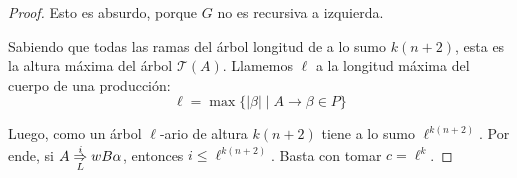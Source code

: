 \begin{proof}
    Esto es absurdo, porque $G$ no es recursiva a izquierda.

    Sabiendo que todas las ramas del árbol longitud de a lo sumo $k (n + 2)$, esta es la altura máxima del árbol $\mathcal T(A)$. Llamemos $\ell$ a la longitud máxima del cuerpo de una producción:
    $$
        \ell = \max \{ |\beta| \mid A \to \beta \in P \}
    $$

    Luego, como un árbol $\ell$-ario de altura $k (n + 2)$ tiene a lo sumo $\ell^{k (n + 2)}$. Por ende, si $A \overset{i}{\underset{L}{\Rightarrow}} w B \alpha$, entonces $i \leq \ell^{k (n + 2)}$. Basta con tomar $c = \ell^k$.
\end{proof}
